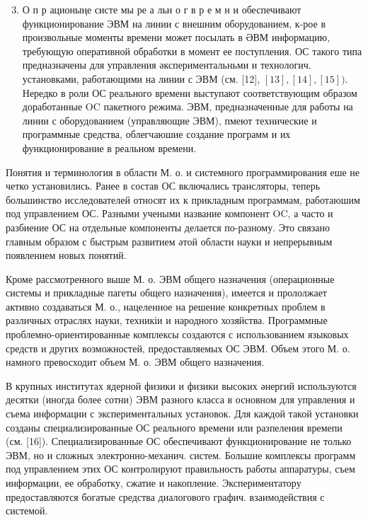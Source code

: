 \documentclass[10pt]{article}
\begin{document}
\begin{enumerate}

  \setcounter{enumi}{2}

  \item О п р ационыңе систе мы ре а льн о г в р е м н и обеспечивают функционирование ЭВМ на линии с внешним оборудованием, к-рое в произвольные моменты времени может посылать в ӘВМ информацию, требующую оперативной обработки в момент ее поступления. ОС такого типа предназначены для управления әкспериментальньми и технологич. установками, работающими на линии с ЭВМ (см. [12], $[13],[14],[15])$. Нередко в роли ОС реального времени выступают соответствующим образом доработанные OC пакетного режима. ЭВМ, предназначенные для работы на линии с оборудованием (управляющие ЭВМ), пмеют технические и программные средства, облегчаюшие создание программ и их функционирование в реальном времени.

\end{enumerate}



Понятия и терминология в области М. о. и системного программирования еше не четко установились. Ранее в состав ОС включались трансляторы, теперь большинство исследователей относят их к прикладным программам, работаюшим под управлением ОС. Разными учеными название компонент OC, а часто и разбиение ОС на отдельные компоненты делается по-разному. Это связано главным образом с быстрым развитием әтой области науки и непрерывным появлением новых понятий.



Кроме рассмотренного выше М. о. ЭВМ общего назначения (операционные системы и прикладные пагеты общего назначения), имеется и прололжает активно создаваться М. о., нацеленное на решение конкретных проблем в различных отраслях науки, техникіи и народного хозяйства. Программные проблемно-ориентированные комплексы создаются с использованием языковых средств и других возможностей, предоставляемых ОС ЭВМ. Объем этого М. о. намного превосходит объем М. о. ЭВМ общего назначения.



В крупных институтах ядерной физики и физики высоких әнергий используются десятки (иногда более сотни) ЭВМ разного класса в основном для управления и съема информации с экспериментальных установок. Для каждой такой установки созданы специализированные ОС реального времени или разпеления времепи (см. [16]). Специализированные ОС обеспечивают функционирование не только ЭВМ, но и сложных электронно-механич. систем. Большие комплексы программ под управлением этих ОС контролируют правильность работы аппаратуры, съем информации, ее обработку, сжатие и накопление. Экспериментатору предоставляются богатые средства диалогового графич. взаимодействия с системой.
\end{document}
